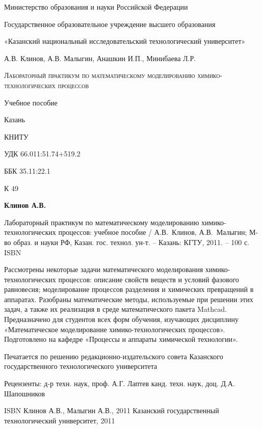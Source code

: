 \begin{center}
	
Министерство образования и науки Российской Федерации

Государственное образовательное учреждение высшего образования

«Казанский национальный исследовательский технологический университет»
\vspace{3 cm}

А.В. Клинов, А.В. Малыгин, Анашкин И.П., Минибаева Л.Р.
\vspace{3 cm}

\textsc{Лабораторный практикум по математическому моделированию химико-технологических процессов}
\vspace{1 cm}

Учебное пособие
\vspace{4 cm}

Казань

КНИТУ

\number\year
\end{center}
\thispagestyle{empty}
\newpage

УДК 66.011:51.74+519.2

ББК 35.11:22.1

К 49

\textbf{Клинов А.В.}

Лабораторный практикум по математическому моделированию химико-технологических процессов: учебное пособие / А.В. Клинов, А.В. Малыгин; М-во образ. и науки РФ, Казан. гос. технол. ун-т. – Казань: КГТУ, 2011. – 100 с.
ISBN



Рассмотрены некоторые задачи математического моделирования химико-технологических процессов: описание свойств веществ и условий фазового равновесия; моделирование процессов разделения и химических превращений в аппаратах. Разобраны математические методы, используемые при решении этих задач, а также их реализация в среде математического пакета Mathcad. 
Предназначено для студентов всех форм обучения, изучающих дисциплину «Математическое моделирование химико-технологических процессов».
Подготовлено на кафедре «Процессы и аппараты химической технологии».

Печатается по решению редакционно-издательского совета Казанского государственного технологического университета





Рецензенты: д-р техн. наук, проф. А.Г. Лаптев
	         канд. техн. наук, доц. Д.А. Шапошников

ISBN 				 Клинов А.В., Малыгин А.В., 2011
				 Казанский государственный
технологический университет, 2011
\thispagestyle{empty}
\newpage
\tableofcontents
\newpage